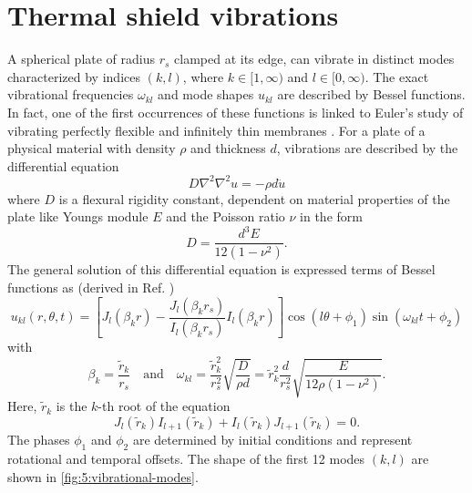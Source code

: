 \section{Thermal shield vibrations}\label{sec:5:thermal-vibrations}

A spherical plate of radius $r_s$ clamped at its edge, can vibrate in distinct modes characterized by indices $(k,l)$, where $k \in [1,\infty)$ and $l \in [0, \infty)$.
The exact vibrational frequencies $\omega_{kl}$ and mode shapes $u_{kl}$ are described by Bessel functions.
In fact, one of the first occurrences of these functions is linked to Euler's study of vibrating perfectly flexible and infinitely thin membranes \cite{Dutka_1995}.
For a plate of a physical material with density $\rho$ and thickness $d$, vibrations are described by the differential equation \cite[p. 490]{Rao_2019}
\begin{equation}
  D \nabla^2\nabla^2 u = -\rho d \ddot{u}
\end{equation} 
where $D$ is a flexural rigidity constant, dependent on material properties of the plate like Youngs module $E$ and the Poisson ratio $\nu$ in the form
\begin{equation}
  D = \frac{d^3 E}{12(1-\nu^2)} .
\end{equation}
The general solution of this differential equation is expressed terms of Bessel functions as (derived in Ref. \cite[p. 490-495]{Rao_2019}) 
\begin{equation}
  u_{kl}(r, \theta, t) = \left[J_l(\beta_k r) - \frac{J_l(\beta_k r_s)}{I_l(\beta_k r_s)}I_l(\beta_k r)\right]\cos(l\theta+\phi_1)\sin(\omega_{kl}t+\phi_2)
\end{equation}
with
\begin{equation} \label{eq:5:vibration-frequency}
  \beta_k = \frac{\tilde{r}_k}{r_s} \quad \text{and} \quad \omega_{kl} = \frac{\tilde{r}_k^2}{r_s^2}\sqrt{\frac{D}{\rho d}} = \tilde{r}_k^2\frac{d}{r_s^2}\sqrt{\frac{E}{12\rho(1-\nu^2)}} .
\end{equation}
Here, $\tilde{r}_k$ is the $k$-th root of the equation
\begin{equation}\label{eq:5:bessel-zeros}
  J_l(\tilde{r}_k)I_{l+1}(\tilde{r}_k)+I_l(\tilde{r}_k)J_{l+1}(\tilde{r}_k) = 0 .
\end{equation}
The phases $\phi_1$ and $\phi_2$ 
are determined by initial conditions and represent rotational and temporal offsets.
The shape of the first 12 modes $(k,l)$ are shown in \cref{fig:5:vibrational-modes}.

